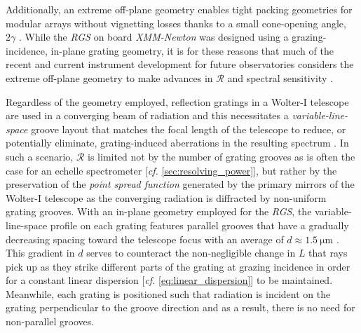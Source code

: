 Additionally, an extreme off-plane geometry enables tight packing geometries for modular arrays without vignetting losses thanks to a small cone-opening angle, $2 \gamma$ \cite{Cash91}. 
While the \emph{RGS} on board \emph{XMM-Newton} was designed using a grazing-incidence, in-plane grating geometry, it is for these reasons that much of the recent and current instrument development for future observatories considers the extreme off-plane geometry to make advances in $\mathscr{R}$ and spectral sensitivity \cite{McEntaffer03,McEntaffer04,McEntaffer08b,McEntaffer09,McEntaffer10,McEntaffer11,McEntaffer13,DeRoo16thesis,DeRoo16,Tutt16,Miles18,Donovan18,Miles19,DeRoo20a,Donovan20}. 

Regardless of the geometry employed, reflection gratings in a Wolter-I telescope are used in a converging beam of radiation and this necessitates a \emph{variable-line-space} groove layout that matches the focal length of the telescope to reduce, or potentially eliminate, grating-induced aberrations in the resulting spectrum \cite{Hettrick83}. 
In such a scenario, $\mathscr{R}$ is limited not by the number of grating grooves as is often the case for an echelle spectrometer [\emph{cf.\@} \cref{sec:resolving_power}], but rather by the preservation of the \emph{point spread function} generated by the primary mirrors of the Wolter-I telescope as the converging radiation is diffracted by non-uniform grating grooves. 
With an in-plane geometry employed for the \emph{RGS}, the variable-line-space profile on each grating features parallel grooves that have a gradually decreasing spacing toward the telescope focus with an average of $d \approx \SI{1.5}{\um}$ \cite{Kahn96,denHerder01}. 
This gradient in $d$ serves to counteract the non-negligible change in $L$ that rays pick up as they strike different parts of the grating at grazing incidence in order for a constant linear dispersion [\emph{cf.\@} \cref{eq:linear_dispersion}] to be maintained. 
Meanwhile, each grating is positioned such that radiation is incident on the grating perpendicular to the groove direction and as a result, there is no need for non-parallel grooves. 

